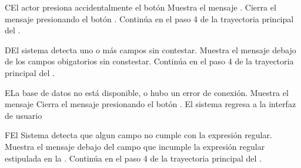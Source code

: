 \begin{UCtrayectoriaA}{C}{El actor presiona accidentalmente el botón }
	\UCpaso Muestra el mensaje .
	\UCpaso[\UCactor] Cierra el mensaje presionando el botón .
	\UCpaso Continúa en el paso 4 de la trayectoria principal del .
\end{UCtrayectoriaA}
\begin{UCtrayectoriaA}{D}{El sistema detecta uno o más campos sin contestar.}
	\UCpaso Muestra el mensaje  debajo de los campos obigatorios sin constestar.
	\UCpaso Continúa en el paso 4 de la trayectoria principal del .
\end{UCtrayectoriaA}
\begin{UCtrayectoriaA}{E}{La base de datos no está disponible, o hubo un error de conexión.}
	\UCpaso Muestra el mensaje 
	\UCpaso[\UCactor] Cierra el mensaje presionando el botón .
	\UCpaso El sistema regresa a la interfaz de usuario 
\end{UCtrayectoriaA}
\begin{UCtrayectoriaA}{F}{El Sistema detecta que algun campo no cumple con la expresión regular.}
	\UCpaso Muestra el mensaje  debajo del campo que incumple la expresión regular estipulada en la .
	\UCpaso Continúa en el paso 4 de la trayectoria principal del .
\end{UCtrayectoriaA}